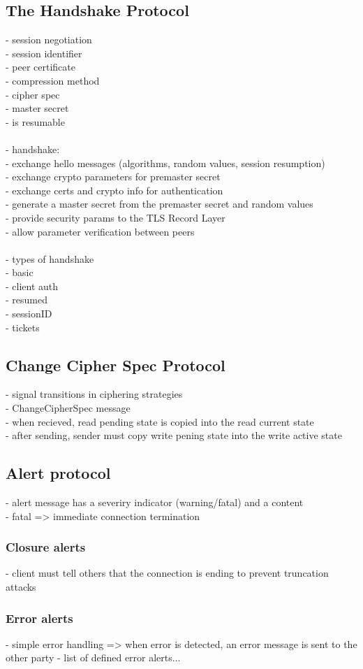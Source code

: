 \subsection{The Handshake Protocol}
- session negotiation \\
    - session identifier \\
    - peer certificate \\
    - compression method \\
    - cipher spec \\
    - master secret \\
    - is resumable \\
\\
- handshake: \\
    - exchange hello messages (algorithms, random values, session resumption) \\
    - exchange crypto parameters for premaster secret \\
    - exchange certs and crypto info for authentication \\
    - generate a master secret from the premaster secret and random values \\
    - provide security params to the TLS Record Layer \\
    - allow parameter verification between peers \\
\\
- types of handshake \\
    - basic \\
    - client auth \\
    - resumed \\
        - sessionID \\
        - tickets
\subsection{Change Cipher Spec Protocol}
- signal transitions in ciphering strategies \\
- ChangeCipherSpec message \\
- when recieved, read pending state is copied into the read current state \\
- after sending, sender must copy write pening state into the write active state
\subsection{Alert protocol}
- alert message has a severiry indicator (warning/fatal) and a content \\
- fatal => immediate connection termination
\subsubsection{Closure alerts}
- client must tell others that the connection is ending to prevent truncation
attacks
\subsubsection{Error alerts}
- simple error handling => when error is detected, an error message is sent
to the other party
- list of defined error alerts...

